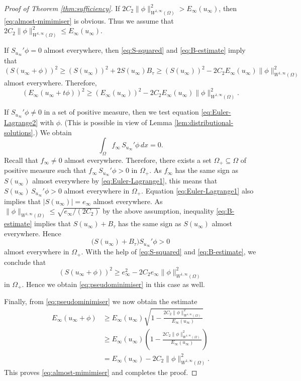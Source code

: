 \documentclass[a4paper]{article}
\theoremstyle{remark}
\begin{document}
\begin{proof}[Proof of Theorem \ref{thm:sufficiency}]
If $2C_2 \|\phi\|_{W^{1, \infty}(\Omega)}^2 > E_\infty(u_\infty)$, then \eqref{eq:almost-mimimiser} is obvious.
Thus we assume that $2C_2 \|\phi\|_{W^{1, \infty}(\Omega)}^2 \le E_\infty(u_\infty)$.

If $S_{u_\infty}' \phi = 0$ almost everywhere, then \eqref{eq:S-squared}
and \eqref{eq:B-estimate} imply that
\[
(S(u_\infty + \phi))^2 \ge (S(u_\infty))^2+ 2 S(u_\infty) B_\tau \ge (S(u_\infty))^2 - 2C_2 E_\infty(u_\infty) \|\phi\|_{W^{1, \infty}(\Omega)}^2
\]
almost everywhere. Therefore,
\begin{equation} \label{eq:pseudominimiser}
(E_\infty(u_\infty + t\phi))^2 \ge (E_\infty(u_\infty))^2 - 2C_2 E_\infty(u_\infty) \|\phi\|_{W^{1, \infty}(\Omega)}^2.
\end{equation}

If $S_{u_\infty}' \phi \neq 0$ in a set of positive measure, then we test equation \eqref{eq:Euler-Lagrange2} with $\phi$.
(This is possible in view of Lemma \ref{lem:distributional-solutions}.) We obtain
\[
\int_\Omega f_\infty \, S_{u_\infty}' \phi \, dx = 0.
\]
Recall that $f_\infty \neq 0$ almost everywhere.
Therefore, there exists a set $\Omega_+ \subseteq \Omega$ of positive measure such
that $f_\infty \, S_{u_\infty}' \phi > 0$ in $\Omega_+$. As $f_\infty$ has the same sign as $S(u_\infty)$
almost everywhere by \eqref{eq:Euler-Lagrange1},
this means that $S(u_\infty) \, S_{u_\infty}' \phi > 0$ almost everywhere in $\Omega_+$.
Equation \eqref{eq:Euler-Lagrange1} also implies that $|S(u_\infty)| = e_\infty$ almost everywhere. As
$\|\phi\|_{W^{1, \infty}(\Omega)} \le \sqrt{e_\infty/(2C_2)}$ by the above assumption, 
inequality \eqref{eq:B-estimate} implies that $S(u_\infty) + B_\tau$ has the same sign as $S(u_\infty)$ almost everywhere. Hence
\[
\bigl(S(u_\infty) + B_\tau\bigr) S_{u_\infty}' \phi > 0
\]
almost everywhere in $\Omega_+$. With the help of \eqref{eq:S-squared} and
\eqref{eq:B-estimate}, we conclude that
\[
(S(u_\infty + \phi))^2 \ge e_\infty^2 - 2C_2 e_\infty \|\phi\|_{W^{1, \infty}(\Omega)}^2
\]
in $\Omega_+$. Hence we obtain \eqref{eq:pseudominimiser} in this case as well.

Finally, from \eqref{eq:pseudominimiser} we now obtain the estimate
\[
\begin{split}
E_\infty(u_\infty + \phi) & \ge E_\infty(u_\infty)\sqrt{1 - \frac{2C_2 \|\phi\|_{W^{1, \infty}(\Omega)}^2}{E_\infty(u_\infty)}} \\
& \ge E_\infty(u_\infty)\left(1 - \frac{2C_2 \|\phi\|_{W^{1, \infty}(\Omega)}^2}{E_\infty(u_\infty)}\right) \\
& = E_\infty(u_\infty) - 2C_2 \|\phi\|_{W^{1, \infty}(\Omega)}^2.
\end{split}
\]
This proves \eqref{eq:almost-mimimiser} and completes the proof.
\end{proof}
\end{document}
